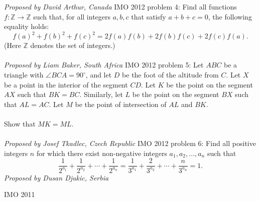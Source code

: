 \textit{Proposed by David Arthur, Canada} 
IMO 2012 problem 4:  Find all functions $f:\mathbb Z\rightarrow \mathbb Z$ such that, for all integers $a,b,c$ that satisfy $a+b+c=0$, the following equality holds:
\[ f(a)^2+f(b)^2+f(c)^2=2f(a)f(b)+2f(b)f(c)+2f(c)f(a). \]
(Here $\mathbb{Z}$ denotes the set of integers.) \\\\
\textit{Proposed by Liam Baker, South Africa} 
IMO 2012 problem 5:  Let $ABC$ be a triangle with $\angle BCA=90^{\circ}$, and let $D$ be the foot of the altitude from $C$. Let $X$ be a point in the interior of the segment $CD$. Let $K$ be the point on the segment $AX$ such that $BK=BC$. Similarly, let $L$ be the point on the segment $BX$ such that $AL=AC$. Let $M$ be the point of intersection of $AL$ and $BK$. \\\\
Show that $MK=ML$. \\\\
\textit{Proposed by Josef Tkadlec, Czech Republic} 
IMO 2012 problem 6:  Find all positive integers $n$ for which there exist non-negative integers $a_1, a_2, \ldots, a_n$ such that
\[
\frac{1}{2^{a_1}} + \frac{1}{2^{a_2}} + \cdots + \frac{1}{2^{a_n}} = 
\frac{1}{3^{a_1}} + \frac{2}{3^{a_2}} + \cdots + \frac{n}{3^{a_n}} = 1.
\]
\textit{Proposed by Dusan Djukic, Serbia} 

IMO 2011 

